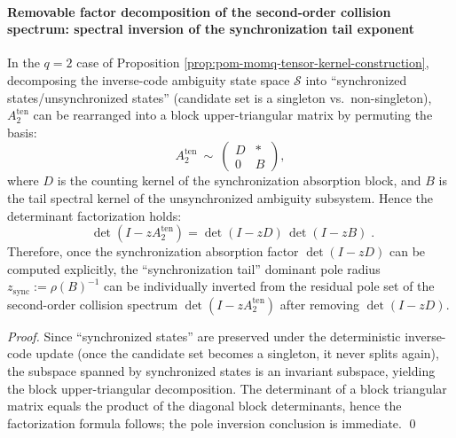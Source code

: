 \paragraph{Removable factor decomposition of the second-order collision spectrum: spectral inversion of the synchronization tail exponent}
\begin{proposition}\label{prop:pom-collision-zeta-removable-sync-factor}
In the \(q=2\) case of Proposition \ref{prop:pom-momq-tensor-kernel-construction}, decomposing the inverse-code ambiguity state space \(\mathcal S\) into ``synchronized states/unsynchronized states'' (candidate set is a singleton vs.\ non-singleton),
\(A_2^{\mathrm{ten}}\) can be rearranged into a block upper-triangular matrix by permuting the basis:
\[
A_2^{\mathrm{ten}}\ \sim\
\begin{pmatrix}
D & *\\
0 & B
\end{pmatrix},
\]
where \(D\) is the counting kernel of the synchronization absorption block, and \(B\) is the tail spectral kernel of the unsynchronized ambiguity subsystem.
Hence the determinant factorization holds:
\[
\boxed{\;
\det(I-zA_2^{\mathrm{ten}})
=
\det(I-zD)\,\det(I-zB)\; }.
\]
Therefore, once the synchronization absorption factor \(\det(I-zD)\) can be computed explicitly, the ``synchronization tail'' dominant pole radius \(z_{\mathrm{sync}}:=\rho(B)^{-1}\) can be individually inverted from the residual pole set of the second-order collision spectrum
\(\det(I-zA_2^{\mathrm{ten}})\)
after removing \(\det(I-zD)\).
\end{proposition}
\begin{proof}
Since ``synchronized states'' are preserved under the deterministic inverse-code update (once the candidate set becomes a singleton, it never splits again), the subspace spanned by synchronized states is an invariant subspace, yielding the block upper-triangular decomposition.
The determinant of a block triangular matrix equals the product of the diagonal block determinants, hence the factorization formula follows; the pole inversion conclusion is immediate. \qed
\end{proof}

